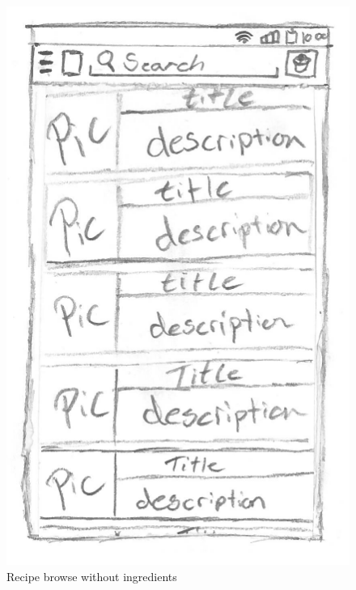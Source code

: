 \begin{figure}[H]
\begin{minipage}[b]{0.5\columnwidth}
\includegraphics[width=0.7\columnwidth]{img/prototypes/recipe_browse3.pdf}
\caption{Recipe browse without ingredients\label{fig:recipenothing}}
\end{minipage}
\end{figure}
